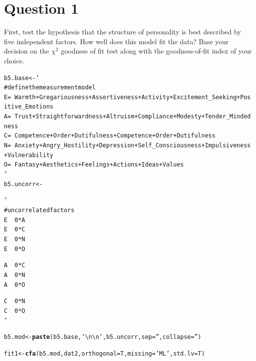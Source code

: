 \documentclass{article}\usepackage[]{graphicx}\usepackage[]{color}
\makeatletter
\newcommand{\hlstr}[1]{\textcolor[rgb]{0.192,0.494,0.8}{#1}}%
\newcommand{\hlstd}[1]{\textcolor[rgb]{0.345,0.345,0.345}{#1}}%
\newcommand{\hlkwb}[1]{\textcolor[rgb]{0.69,0.353,0.396}{#1}}%
\newcommand{\hlkwc}[1]{\textcolor[rgb]{0.333,0.667,0.333}{#1}}%
\newcommand{\hlkwd}[1]{\textcolor[rgb]{0.737,0.353,0.396}{\textbf{#1}}}%
\newenvironment{kframe}{%
 \def\at@end@of@kframe{}%
 \ifinner\ifhmode%
  \def\at@end@of@kframe{\end{minipage}}%
  \begin{minipage}{\columnwidth}%
 \fi\fi%
 \def\FrameCommand##1{\hskip\@totalleftmargin \hskip-\fboxsep
 \colorbox{shadecolor}{##1}\hskip-\fboxsep
     \hskip-\linewidth \hskip-\@totalleftmargin \hskip\columnwidth}%
 \MakeFramed {\advance\hsize-\width
   \@totalleftmargin\z@ \linewidth\hsize
   \@setminipage}}%
 {\par\unskip\endMakeFramed%
 \at@end@of@kframe}
\newenvironment{knitrout}{}{} %
\makeatother
\begin{document}
\section{Question 1}
First, test the hypothesis that the structure of personality is best described by five independent factors. How well does this model fit the data? Base your decision on the $\chi^2$ goodness of fit test along with the goodness-of-fit index of your choice.  
\begin{knitrout}
\color{fgcolor}\begin{kframe}
\begin{alltt}
\hlstd{b5.base} \hlkwb{<-} \hlstr{'
# define the measurement model
E =~ Warmth + Gregariousness + Assertiveness + Activity + Excitement_Seeking + Positive_Emotions
A =~ Trust + Straightforwardness + Altruism + Compliance + Modesty + Tender_Mindedness
C =~ Competence + Order + Dutifulness + Competence + Order + Dutifulness
N =~ Anxiety + Angry_Hostility + Depression + Self_Consciousness + Impulsiveness + Vulnerability
O =~ Fantasy + Aesthetics + Feelings + Actions + Ideas + Values
'}
\hlstd{b5.uncorr} \hlkwb{<-}
\hlstr{'
# uncorrelated factors
E ~~ 0*A
E ~~ 0*C
E ~~ 0*N
E ~~ 0*O

A ~~ 0*C
A ~~ 0*N
A ~~ 0*O

C ~~ 0*N
C ~~ 0*O
'}

\hlstd{b5.mod} \hlkwb{<-} \hlkwd{paste}\hlstd{(b5.base,} \hlstr{'\textbackslash{}n\textbackslash{}n'}\hlstd{, b5.uncorr,} \hlkwc{sep} \hlstd{=} \hlstr{''}\hlstd{,} \hlkwc{collapse} \hlstd{=} \hlstr{''}\hlstd{)}

\hlstd{fit1} \hlkwb{<-} \hlkwd{cfa}\hlstd{(b5.mod, dat2,} \hlkwc{orthogonal} \hlstd{= T,} \hlkwc{missing} \hlstd{=} \hlstr{'ML'}\hlstd{,} \hlkwc{std.lv} \hlstd{= T)}


\end{alltt}
\end{kframe}
\end{knitrout}
\end{document}
